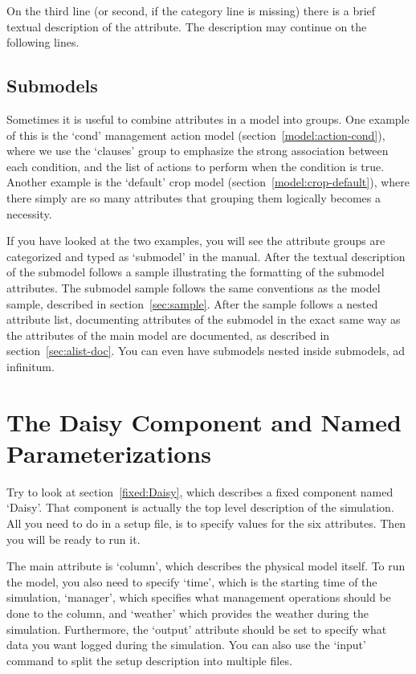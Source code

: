 On the third line (or second, if the category line is missing) there
is a brief textual description of the attribute.  The description may
continue on the following lines.

\subsection{Submodels}

Sometimes it is useful to combine attributes in a model into groups.
One example of this is the `cond' management action model
(section~\ref{model:action-cond}), where we use the `clauses' group to
emphasize the strong association between each condition, and the list
of actions to perform when the condition is true.  Another example is
the `default' crop model (section~\ref{model:crop-default}), where
there simply are so many attributes that grouping them logically
becomes a necessity.

If you have looked at the two examples, you will see the attribute
groups are categorized and typed as `submodel' in the manual.  After
the textual description of the submodel follows a sample illustrating
the formatting of the submodel attributes.  The submodel sample
follows the same conventions as the model sample, described in
section~\ref{sec:sample}.  After the sample follows a nested attribute
list, documenting attributes of the submodel in the exact same way as
the attributes of the main model are documented, as described in
section~\ref{sec:alist-doc}.  You can even have submodels nested
inside submodels, ad infinitum.

\section{The Daisy Component and Named Parameterizations}
\label{sec:daisy}

Try to look at section~\ref{fixed:Daisy}, which describes a fixed
component named `Daisy'.  That component is actually the top level
description of the simulation.  All you need to do in a setup file, is
to specify values for the six attributes.  Then you will be ready to
run it.

The main attribute is `column', which describes the physical model
itself.  To run the model, you also need to specify `time', which is
the starting time of the simulation, `manager', which specifies what
management operations should be done to the column, and `weather'
which provides the weather during the simulation.  Furthermore, the
`output' attribute should be set to specify what data you want logged
during the simulation.  You can also use the `input' command to split
the setup description into multiple files. 

